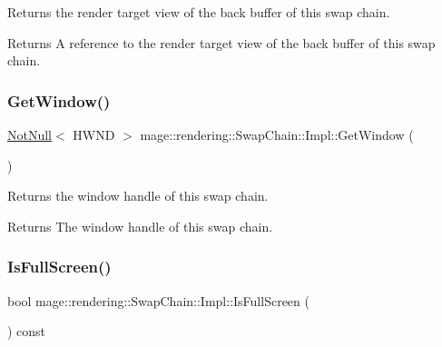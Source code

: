 Returns the render target view of the back buffer of this swap chain.

\begin{DoxyReturn}{Returns}
A reference to the render target view of the back buffer of this swap chain. 
\end{DoxyReturn}
\mbox{\label{classmage_1_1rendering_1_1_swap_chain_1_1_impl_a58ee8003efb4b792d6e6315a1a691b5c}} 
\subsubsection{\texorpdfstring{Get\+Window()}{GetWindow()}}
{\footnotesize\ttfamily \mbox{\hyperlink{namespacemage_a8769f9d670d6b585ea306cb1062af94b}{Not\+Null}}$<$ H\+W\+ND $>$ mage\+::rendering\+::\+Swap\+Chain\+::\+Impl\+::\+Get\+Window (\begin{DoxyParamCaption}{ }\end{DoxyParamCaption})\hspace{0.3cm}{\ttfamily [noexcept]}}

Returns the window handle of this swap chain.

\begin{DoxyReturn}{Returns}
The window handle of this swap chain. 
\end{DoxyReturn}
\mbox{\label{classmage_1_1rendering_1_1_swap_chain_1_1_impl_abd74163f68b0a078f970d3d54d1dcd7e}} 
\subsubsection{\texorpdfstring{Is\+Full\+Screen()}{IsFullScreen()}}
{\footnotesize\ttfamily bool mage\+::rendering\+::\+Swap\+Chain\+::\+Impl\+::\+Is\+Full\+Screen (\begin{DoxyParamCaption}{ }\end{DoxyParamCaption}) const\hspace{0.3cm}{\ttfamily [noexcept]}}

